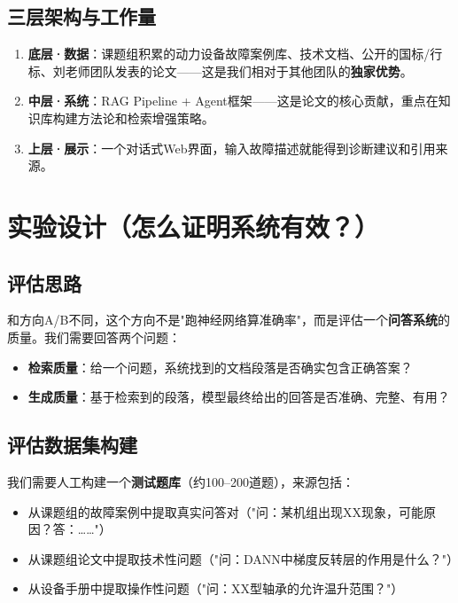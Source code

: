 \documentclass[a4paper, 11pt]{ctexart}
\begin{document}
\subsection{三层架构与工作量}
\begin{enumerate}
    \item \textbf{底层·数据}：课题组积累的动力设备故障案例库、技术文档、公开的国标/行标、刘老师团队发表的论文——这是我们相对于其他团队的\textbf{独家优势}。
    \item \textbf{中层·系统}：RAG Pipeline + Agent框架——这是论文的核心贡献，重点在知识库构建方法论和检索增强策略。
    \item \textbf{上层·展示}：一个对话式Web界面，输入故障描述就能得到诊断建议和引用来源。
\end{enumerate}


\section{实验设计（怎么证明系统有效？）}

\subsection{评估思路}

和方向A/B不同，这个方向不是"跑神经网络算准确率"，而是评估一个\textbf{问答系统}的质量。我们需要回答两个问题：
\begin{itemize}
    \item \textbf{检索质量}：给一个问题，系统找到的文档段落是否确实包含正确答案？
    \item \textbf{生成质量}：基于检索到的段落，模型最终给出的回答是否准确、完整、有用？
\end{itemize}

\subsection{评估数据集构建}

我们需要人工构建一个\textbf{测试题库}（约100--200道题），来源包括：
\begin{itemize}
    \item 从课题组的故障案例中提取真实问答对（"问：某机组出现XX现象，可能原因？答：……"）
    \item 从课题组论文中提取技术性问题（"问：DANN中梯度反转层的作用是什么？"）
    \item 从设备手册中提取操作性问题（"问：XX型轴承的允许温升范围？"）
\end{itemize}
\end{document}
